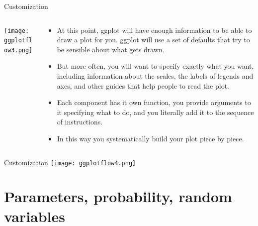 \documentclass[10pt]{beamer}\usepackage[]{graphicx}\usepackage[]{color}
\begin{document}
\begin{frame}{Customization}
	\begin{columns}
		\begin{column}{0.5\textwidth}  %
			\begin{center}
				\texttt{[image: ggplotflow3.png]}
			\end{center}
		\end{column}
		\begin{column}{0.5\textwidth}
			\begin{itemize}
				\item At this point, ggplot will have enough information to be able to draw
				a plot for you. ggplot will use a set of defaults that try to be sensible about what gets drawn. 
				\item But more often, you will want to specify exactly what you want, including
				information about the scales, the labels of legends and axes, and
				other guides that help people to read the plot. 
				\item Each component has it own function, you provide arguments to it
				specifying what to do, and you literally add it to the sequence of
				instructions. 
				\item In this way you systematically build your plot piece by
				piece.
			\end{itemize}
		\end{column}
	\end{columns}
\end{frame}



\begin{frame}{Customization}
	\centering
	\texttt{[image: ggplotflow4.png]}
\end{frame}



\section{Parameters, probability, random variables}
\end{document}
